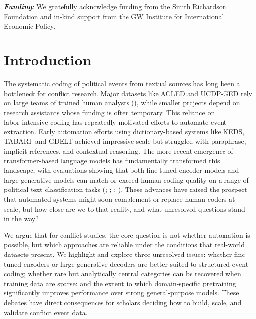 \documentclass[
  11pt,
]{article}
\providecommand{\fundinginfo}[1]{\textbf{\textit{Funding: }}#1}
\begin{document}
\vspace{0.25in}



\vspace{0.25in}


\noindent
\fundinginfo{We gratefully acknowledge funding from the Smith Richardson
Foundation and in-kind support from the GW Institute for International
Economic Policy.}



\restoregeometry

\section{Introduction}\label{introduction}

The systematic coding of political events from textual sources has long
been a bottleneck for conflict research. Major datasets like ACLED and
UCDP-GED rely on large teams of trained human analysts
(), while smaller projects depend on
research assistants whose funding is often temporary. This reliance on
labor‑intensive coding has repeatedly motivated efforts to automate
event extraction. Early automation efforts using dictionary-based
systems like KEDS, TABARI, and GDELT achieved impressive scale but
struggled with paraphrase, implicit references, and contextual
reasoning. The more recent emergence of transformer-based language
models has fundamentally transformed this landscape, with evaluations
showing that both fine-tuned encoder models and large generative models
can match or exceed human coding quality on a range of political text
classification tasks (; ;
;
).
These advances have raised the prospect that automated systems might
soon complement or replace human coders at scale, but how close are we
to that reality, and what unresolved questions stand in the way?

We argue that for conflict studies, the core question is not whether
automation is possible, but which approaches are reliable under the
conditions that real-world datasets present. We highlight and explore
three unresolved issues: whether fine-tuned encoders or large generative
decoders are better suited to structured event coding; whether rare but
analytically central categories can be recovered when training data are
sparse; and the extent to which domain-specific pretraining
significantly improves performance over strong general-purpose models.
These debates have direct consequences for scholars deciding how to
build, scale, and validate conflict event data.
\end{document}
